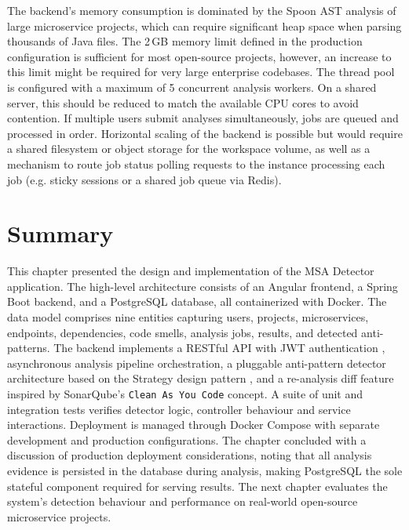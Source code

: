  \par The backend's memory consumption is dominated by the Spoon AST analysis of large microservice projects, which can require significant heap space when parsing thousands of Java files. The 2\,GB memory limit defined in the production configuration is sufficient for most open-source projects, however, an increase to this limit might be required for very large enterprise codebases. The thread pool is configured with a maximum of 5 concurrent analysis workers. On a shared server, this should be reduced to match the available CPU cores to avoid contention. If multiple users submit analyses simultaneously, jobs are queued and processed in order. Horizontal scaling of the backend is possible but would require a shared filesystem or object storage for the workspace volume, as well as a mechanism to route job status polling requests to the instance processing each job (e.g. sticky sessions or a shared job queue via Redis).
\fi

\section{Summary}
\label{sec:ch4-summary}

\par This chapter presented the design and implementation of the MSA Detector application. The high-level architecture consists of an Angular frontend, a Spring Boot backend, and a PostgreSQL database, all containerized with Docker. The data model comprises nine entities capturing users, projects, microservices, endpoints, dependencies, code smells, analysis jobs, results, and detected anti-patterns. The backend implements a RESTful API \cite{Fielding2000} with JWT authentication \cite{RFC7519}, asynchronous analysis pipeline orchestration, a pluggable anti-pattern detector architecture based on the Strategy design pattern \cite{Gamma1994}, and a re-analysis diff feature inspired by SonarQube's \texttt{Clean As You Code} concept. A suite of unit and integration tests verifies detector logic, controller behaviour and service interactions. Deployment is managed through Docker Compose with separate development and production configurations. The chapter concluded with a discussion of production deployment considerations, noting that all analysis evidence is persisted in the database during analysis, making PostgreSQL the sole stateful component required for serving results. The next chapter evaluates the system's detection behaviour and performance on real-world open-source microservice projects.
